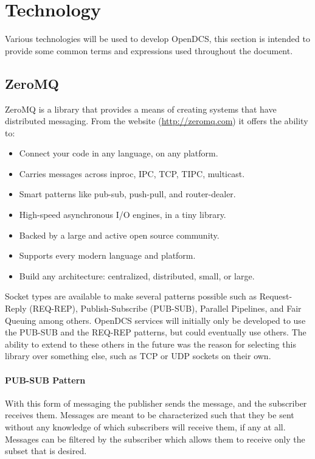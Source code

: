 \section{Technology}\label{sec:tech}

  Various technologies will be used to develop OpenDCS, this section is intended
  to provide some common terms and expressions used throughout the document.

  \subsection{ZeroMQ}\label{sec:tech-zmq}

    ZeroMQ is a library that provides a means of creating systems that have
    distributed messaging. From the website (\url{http://zeromq.com}) it offers
    the ability to:

    \begin{itemize}
      \item Connect your code in any language, on any platform.
      \item Carries messages across inproc, IPC, TCP, TIPC, multicast.
      \item Smart patterns like pub-sub, push-pull, and router-dealer.
      \item High-speed asynchronous I/O engines, in a tiny library.
      \item Backed by a large and active open source community.
      \item Supports every modern language and platform.
      \item Build any architecture: centralized, distributed, small, or large.
    \end{itemize}

    Socket types are available to make several patterns possible such as
    Request-Reply (REQ-REP), Publish-Subscribe (PUB-SUB), Parallel Pipelines,
    and Fair Queuing among others. OpenDCS services will initially only be
    developed to use the PUB-SUB and the REQ-REP patterns, but could eventually
    use others. The ability to extend to these others in the future was the
    reason for selecting this library over something else, such as TCP or UDP
    sockets on their own.

    \paragraph{PUB-SUB Pattern}

      With this form of messaging the publisher sends the message, and the
      subscriber receives them. Messages are meant to be characterized such
      that they be sent without any knowledge of which subscribers will receive
      them, if any at all. Messages can be filtered by the subscriber which
      allows them to receive only the subset that is desired.

